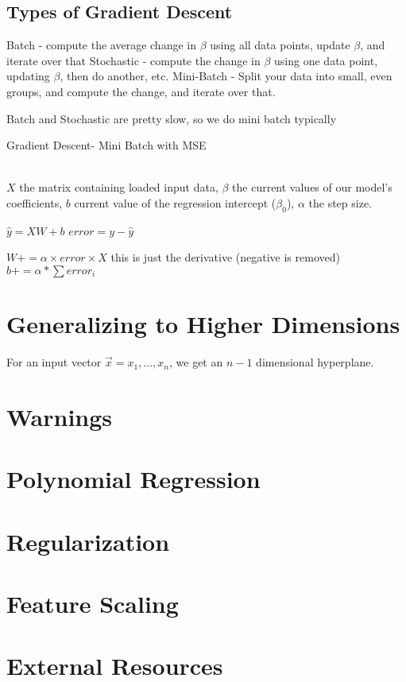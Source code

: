 \documentclass{article}
\begin{document}
\subsection{Types of Gradient Descent}
Batch - compute the average change in $\beta$ using all data points, update $\beta$, and iterate over that
Stochastic - compute the change in $\beta$ using one data point, updating $\beta$, then do another, etc.
Mini-Batch - Split your data into small, even groups, and compute the change, and iterate over that.

Batch and Stochastic are pretty slow, so we do mini batch typically
\begin{algorithm}
	\caption{Gradient Descent- Mini Batch with MSE}
	\begin{algorithmic}
		\\
			 \Comment $X$ the matrix containing loaded input data, $\beta$ the current values of our model's coefficients, $b$ current value of the regression intercept ($\beta_0$), $\alpha$ the step size. 
			 
			 $\hat{y} = XW + b$
			 $error = y - \hat{y}$
			 
			 $W += \alpha\times error\times X$ \Comment this is just the derivative (negative is removed)
			 $b += \alpha * \sum error_i$
		\EndProcedure
	\end{algorithmic}
\end{algorithm}

\section{Generalizing to Higher Dimensions}

For an input vector $\vec{x} = x_1, ..., x_n$, we get an $n-1$ dimensional hyperplane.

\section{Warnings}

\section{Polynomial Regression}

\section{Regularization}

\section{Feature Scaling}

\section{External Resources}
\end{document}
